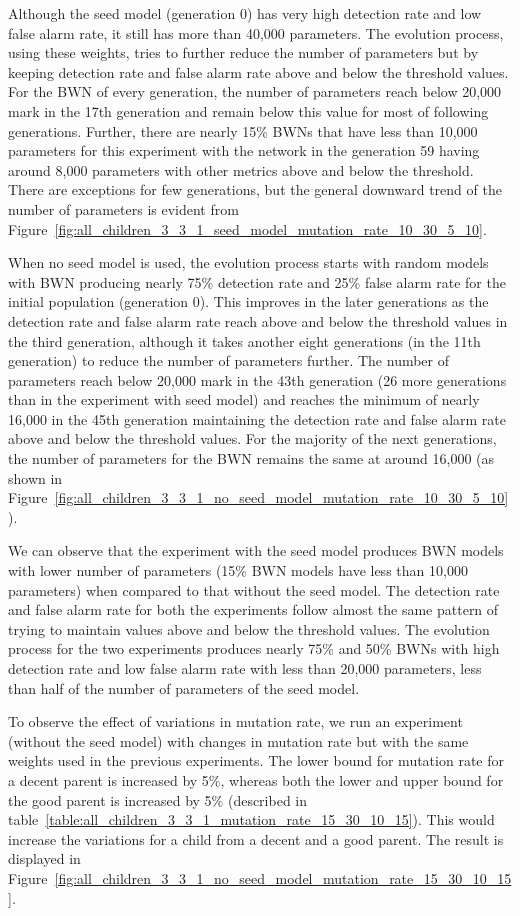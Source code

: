 Although the seed model (generation 0) has very high detection rate and low false alarm rate, it still has more than 40,000 parameters. The evolution process, using these weights, tries to further reduce the number of parameters but by keeping detection rate and false alarm rate above and below the threshold values. For the BWN of every generation, the number of parameters reach below 20,000 mark in the 17th generation and remain below this value for most of following generations. Further, there are nearly 15\% BWNs that have less than 10,000 parameters for this experiment with the network in the generation 59 having around 8,000 parameters with other metrics above and below the threshold. There are exceptions for few generations, but the general downward trend of the number of parameters is evident from Figure~\ref{fig:all_children_3_3_1_seed_model_mutation_rate_10_30_5_10}.

When no seed model is used, the evolution process starts with random models with BWN producing nearly 75\% detection rate and 25\% false alarm rate for the initial population (generation 0). This improves in the later generations as the detection rate and false alarm rate reach above and below the threshold values in the third generation, although it takes another eight generations (in the 11th generation) to reduce the number of parameters further. The number of parameters reach below 20,000 mark in the 43th generation (26 more generations than in the experiment with seed model) and reaches the minimum of nearly 16,000 in the 45th generation maintaining the detection rate and false alarm rate above and below the threshold values. For the majority of the next generations, the number of parameters for the BWN remains the same at around 16,000 (as shown in Figure~\ref{fig:all_children_3_3_1_no_seed_model_mutation_rate_10_30_5_10}).

We can observe that the experiment with the seed model produces BWN models with lower number of parameters (15\% BWN models have less than 10,000 parameters) when compared to that without the seed model. The detection rate and false alarm rate for both the experiments follow almost the same pattern of trying to maintain values above and below the threshold values. The evolution process for the two experiments produces nearly 75\% and 50\% BWNs with high detection rate and low false alarm rate with less than 20,000 parameters, less than half of the number of parameters of the seed model.

To observe the effect of variations in mutation rate, we run an experiment (without the seed model) with changes in mutation rate but with the same weights used in the previous experiments. The lower bound for mutation rate for a decent parent is increased by 5\%, whereas both the lower and upper bound for the good parent is increased by 5\% (described in table~\ref{table:all_children_3_3_1_mutation_rate_15_30_10_15}). This would increase the variations for a child from a decent and a good parent. The result is displayed in Figure~\ref{fig:all_children_3_3_1_no_seed_model_mutation_rate_15_30_10_15}.


